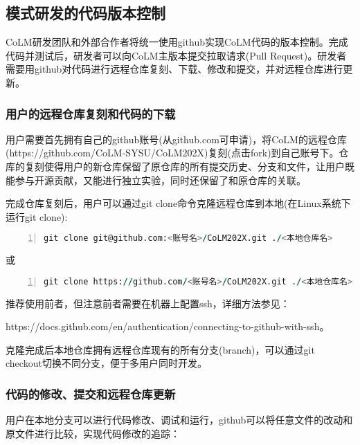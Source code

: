 \subsection{模式研发的代码版本控制}
CoLM研发团队和外部合作者将统一使用github实现CoLM代码的版本控制。完成代码并测试后，研发者可以向CoLM主版本提交拉取请求(Pull Request)。研发者需要用github对代码进行远程仓库复刻、下载、修改和提交，并对远程仓库进行更新。

\subsubsection{用户的远程仓库复刻和代码的下载}
用户需要首先拥有自己的github账号(从github.com可申请)，将CoLM的远程仓库(https://github.com/CoLM-SYSU/CoLM202X)复刻(点击fork)到自己账号下。仓库的复刻使得用户的新仓库保留了原仓库的所有提交历史、分支和文件，让用户既能参与开源贡献，又能进行独立实验，同时还保留了和原仓库的关联。

完成仓库复刻后，用户可以通过git clone命令克隆远程仓库到本地(在Linux系统下运行git clone):
\begin{lstlisting}[language=fortran, basicstyle=\linespread{1.0}\footnotesize\ttfamily, commentstyle=\color{black}, numbers=left, numberstyle=\tiny, xleftmargin=1.5em,xrightmargin=0em, aboveskip=1em]
    git clone git@github.com:<账号名>/CoLM202X.git ./<本地仓库名>
\end{lstlisting}


或
\begin{lstlisting}[language=fortran, basicstyle=\linespread{1.0}\footnotesize\ttfamily, commentstyle=\color{black}, numbers=left, numberstyle=\tiny, xleftmargin=1.5em,xrightmargin=0em, aboveskip=1em]
    git clone https://github.com/<账号名>/CoLM202X.git ./<本地仓库名>
\end{lstlisting}


推荐使用前者，但注意前者需要在机器上配置ssh，详细方法参见：

https://docs.github.com/en/authentication/connecting-to-github-with-ssh。

克隆完成后本地仓库拥有远程仓库现有的所有分支(branch)，可以通过git checkout切换不同分支，便于多用户同时开发。

\subsubsection{代码的修改、提交和远程仓库更新}

用户在本地分支可以进行代码修改、调试和运行，github可以将任意文件的改动和原文件进行比较，实现代码修改的追踪：

